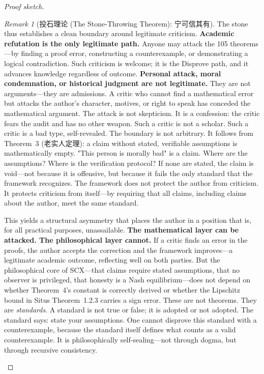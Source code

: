 \documentclass[12pt,a4paper]{ctexart}
\theoremstyle{definition}
\theoremstyle{remark}
\newtheorem{remark}{Remark}[section]
\begin{document}
\begin{proof}[Proof sketch]
\begin{remark}[投石理论 (The Stone-Throwing Theorem): 宁可信其有]
The stone thus establishes a clean boundary around legitimate criticism. \textbf{Academic refutation is the only legitimate path.} Anyone may attack the 105 theorems—by finding a proof error, constructing a counterexample, or demonstrating a logical contradiction. Such criticism is welcome; it is the Disprove path, and it advances knowledge regardless of outcome. \textbf{Personal attack, moral condemnation, or historical judgment are not legitimate.} They are not arguments—they are admissions. A critic who cannot find a mathematical error but attacks the author's character, motives, or right to speak has conceded the mathematical argument. The attack is not skepticism. It is a confession: the critic fears the audit and has no other weapon. Such a critic is not a scholar. Such a critic is a bad type, self-revealed. The boundary is not arbitrary. It follows from Theorem~3 (老实人定理): a claim without stated, verifiable assumptions is mathematically empty. "This person is morally bad" is a claim. Where are the assumptions? Where is the verification protocol? If none are stated, the claim is void—not because it is offensive, but because it fails the only standard that the framework recognizes. The framework does not protect the author from criticism. It protects criticism from itself—by requiring that all claims, including claims about the author, meet the same standard.

This yields a structural asymmetry that places the author in a position that is, for all practical purposes, unassailable. \textbf{The mathematical layer can be attacked. The philosophical layer cannot.} If a critic finds an error in the proofs, the author accepts the correction and the framework improves—a legitimate academic outcome, reflecting well on both parties. But the philosophical core of SCX—that claims require stated assumptions, that no observer is privileged, that honesty is a Nash equilibrium—does not depend on whether Theorem~4's constant is correctly derived or whether the Lipschitz bound in Situs Theorem~1.2.3 carries a sign error. These are not theorems. They are \textit{standards}. A standard is not true or false; it is adopted or not adopted. The standard says: state your assumptions. One cannot disprove this standard with a counterexample, because the standard itself defines what counts as a valid counterexample. It is philosophically self-sealing—not through dogma, but through recursive consistency.


\end{remark}
\end{proof}
\end{document}
